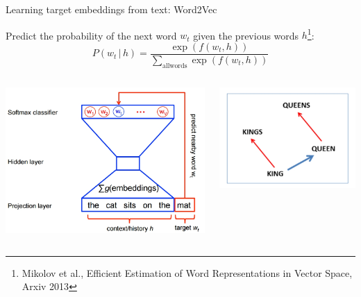 \documentclass[]{beamer}
\newcommand{\given}{\, | \,}
\begin{document}
\begin{frame}{Learning target embeddings from text: Word2Vec}

Predict the probability of the next word $w_t$ given the previous words $h$\footnote{Mikolov et al., Efficient Estimation of Word Representations in
Vector Space, Arxiv 2013}:
$$P(w_t \given h) = \frac{\exp(f(w_t,h))}{\sum_{\mathrm{all words}} \exp(f(w_t,h))}$$
\begin{columns}
\begin{column}{5cm}
\includegraphics[scale=0.2]{Figures/word2vec}
\end{column}
\begin{column}{6cm}
\hspace{1cm} \includegraphics[scale=0.2]{Figures/kingqueen}
\end{column}
\end{columns}



\end{frame}
\end{document}
